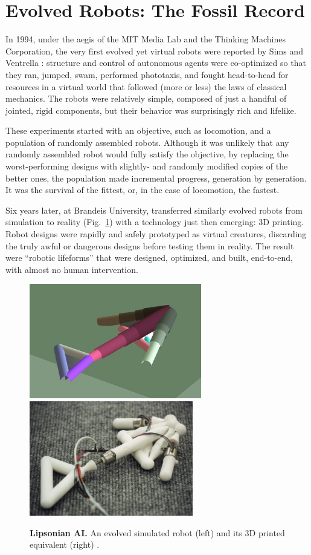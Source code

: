 \section{Evolved Robots: The Fossil Record}


In 1994,
under the aegis of the MIT Media Lab and the Thinking Machines Corporation,
the very first evolved yet virtual robots were reported by Sims \cite{sims1994evolving,sims1994comp} and Ventrella \cite{ventrella1994explorations}: structure and control of autonomous agents were co-optimized so that they ran, jumped, swam, performed phototaxis, and fought head-to-head for resources in a virtual world that followed (more or less) the laws of classical mechanics. 
The robots were relatively simple, composed of just a handful of jointed, rigid components, but their behavior was surprisingly rich and lifelike.

These experiments started with an objective, such as locomotion, and a population of randomly assembled robots. 
Although it was unlikely that any randomly assembled robot would fully satisfy the objective, by replacing the worst-performing designs with slightly- and randomly modified copies of the better ones, the population made incremental progress, generation by generation. 
It was the survival of the fittest, or, in the case of locomotion, the fastest.

Six years later,
at Brandeis University, \citet{lipson2000automatic} transferred similarly evolved robots from simulation to reality (Fig.~\ref{fig:lipson}) with a technology just then emerging: 3D printing. Robot designs were rapidly and safely prototyped as virtual creatures, discarding the truly awful or dangerous designs before testing them in reality. 
The result were ``robotic lifeforms'' that were designed, optimized, and built, end-to-end, with almost no human intervention. 


\begin{figure}
\centering
\includegraphics[height=5cm]{fig/arrow-hires1.jpg}
\includegraphics[height=5cm]{fig/arrow-hires2.jpg}
\caption{\label{fig:lipson}%
\textbf{Lipsonian AI.}
An evolved simulated robot (left) and its 3D printed equivalent (right) \cite{lipson2000automatic}.
}
\end{figure}


